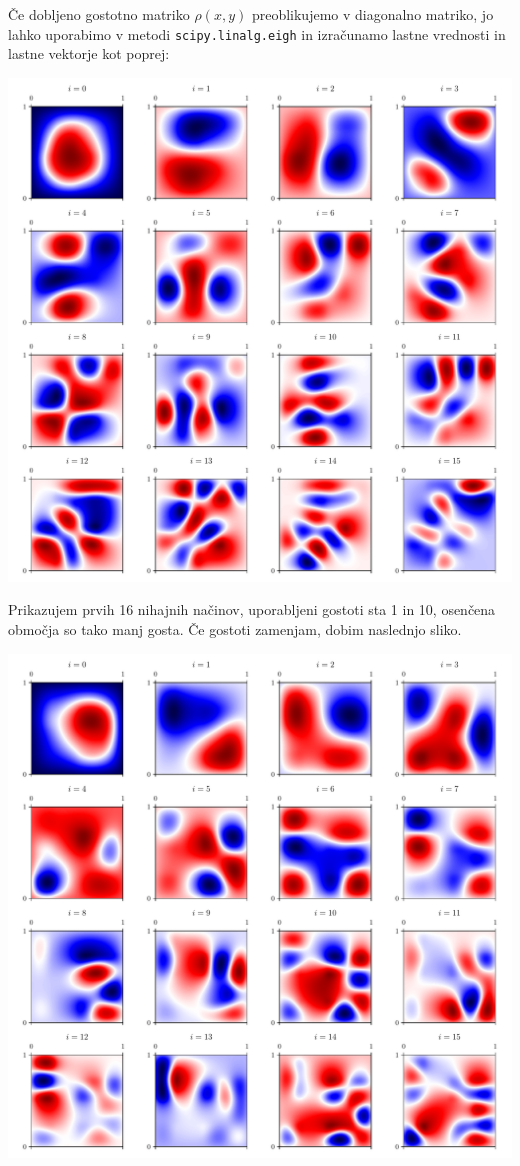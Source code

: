Če dobljeno gostotno matriko $\rho(x,y)$ preoblikujemo v diagonalno matriko, jo lahko uporabimo v metodi \texttt{scipy.linalg.eigh} in izračunamo lastne vrednosti in lastne vektorje kot poprej:
\begin{center}
    \includegraphics[width=\textwidth]{../old/1-1-nihajni_nacini.pdf}
\end{center}
Prikazujem prvih 16 nihajnih načinov, uporabljeni gostoti sta 1 in 10, osenčena območja so tako manj gosta. Če gostoti zamenjam, dobim naslednjo sliko.
\begin{center}
    \includegraphics[width=\textwidth]{../old/1-1-nihajni_nacini_inverted.pdf}
\end{center}
